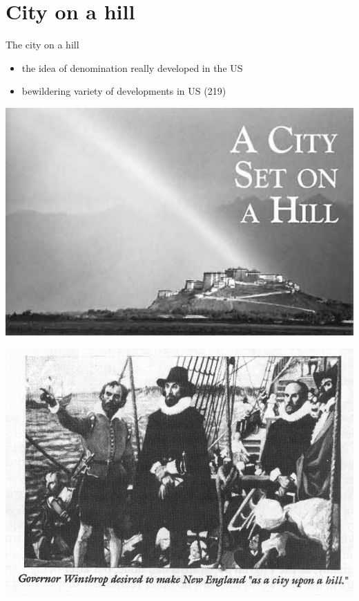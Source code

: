 \section{City on a hill}
\label{sec-2}
\begin{frame}[label=sec-2-1]{The city on a hill}
\begin{itemize}
\item the \alert{idea} of \alert{denomination} really developed in the US
\item bewildering variety of developments in US (219)
\end{itemize}
\end{frame}

\begin{frame}[label=sec-2-2]{}
\includegraphics[width=.9\linewidth]{./img/city-on-hill-01.jpg}
\end{frame}

\begin{frame}[label=sec-2-3]{}
\includegraphics[width=.9\linewidth]{./img/winthrop.jpg}
\end{frame}

